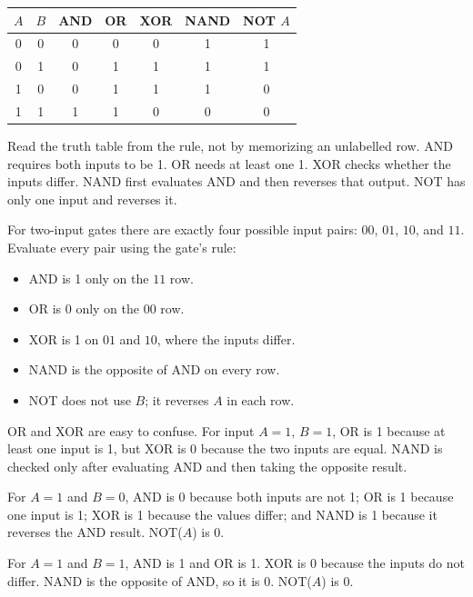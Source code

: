 \begin{center}
\begin{tabular}{cc|cccc|c}
\toprule
$A$ & $B$ & AND & OR & XOR & NAND & NOT $A$\\
\midrule
0 & 0 & 0 & 0 & 0 & 1 & 1\\
0 & 1 & 0 & 1 & 1 & 1 & 1\\
1 & 0 & 0 & 1 & 1 & 1 & 0\\
1 & 1 & 1 & 1 & 0 & 0 & 0\\
\bottomrule
\end{tabular}
\end{center}

Read the truth table from the rule, not by memorizing an unlabelled row.
AND requires both inputs to be 1. OR needs at least one 1. XOR checks
whether the inputs differ. NAND first evaluates AND and then reverses that
output. NOT has only one input and reverses it.

For two-input gates there are exactly four possible input pairs:
$00$, $01$, $10$, and $11$. Evaluate every pair using the gate's rule:
\begin{itemize}
  \item AND is 1 only on the $11$ row.
  \item OR is 0 only on the $00$ row.
  \item XOR is 1 on $01$ and $10$, where the inputs differ.
  \item NAND is the opposite of AND on every row.
  \item NOT does not use $B$; it reverses $A$ in each row.
\end{itemize}
OR and XOR are easy to confuse. For input $A=1$, $B=1$, OR is 1 because
at least one input is 1, but XOR is 0 because the two inputs are equal.
NAND is checked only after evaluating AND and then taking the opposite
result.

\begin{example}
For $A=1$ and $B=0$, AND is 0 because both inputs are not 1; OR is 1
because one input is 1; XOR is 1 because the values differ; and NAND is 1
because it reverses the AND result. NOT($A$) is 0.
\end{example}

\begin{example}
For $A=1$ and $B=1$, AND is 1 and OR is 1. XOR is 0 because the inputs do
not differ. NAND is the opposite of AND, so it is 0. NOT($A$) is 0.
\end{example}

